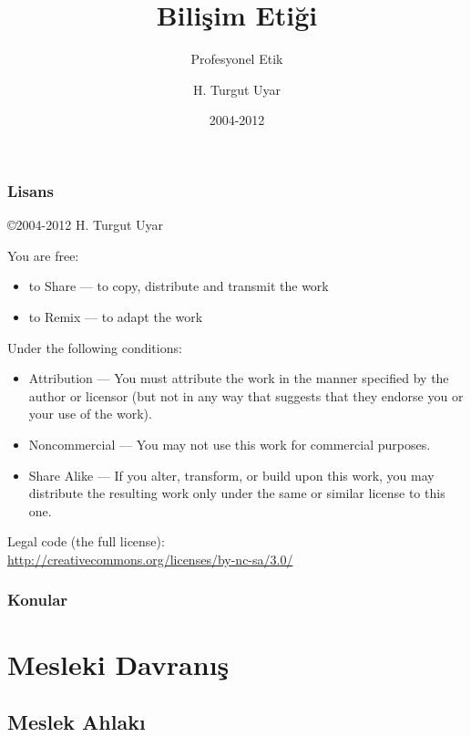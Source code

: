 \documentclass[dvipsnames]{beamer}
\title{Bilişim Etiği}
\subtitle{Profesyonel Etik}
\author{H. Turgut Uyar}
\date{2004-2012}
\theoremstyle{definition}
\theoremstyle{example}
\theoremstyle{plain}
\begin{document}
\begin{frame}
  \titlepage
\end{frame}

\begin{frame}
  \frametitle{Lisans}

  \hfill
  \copyright 2004-2012 H. Turgut Uyar

  \vfill
  \begin{tiny}
    You are free:
    \begin{itemize}
      \item to Share — to copy, distribute and transmit the work
      \item to Remix — to adapt the work
    \end{itemize}

    Under the following conditions:
    \begin{itemize}
      \item Attribution — You must attribute the work in the manner specified by
        the author or licensor (but not in any way that suggests that they
        endorse you or your use of the work).

      \item Noncommercial — You may not use this work for commercial purposes.

      \item Share Alike — If you alter, transform, or build upon this work, you
        may distribute the resulting work only under the same or similar license
        to this one.
    \end{itemize}
  \end{tiny}

  \vfill
  Legal code (the full license):\\
  \url{http://creativecommons.org/licenses/by-nc-sa/3.0/}
\end{frame}

\begin{frame}
  \frametitle{Konular}
  \tableofcontents
\end{frame}

\section{Mesleki Davranış}

\subsection{Meslek Ahlakı}
\end{document}

